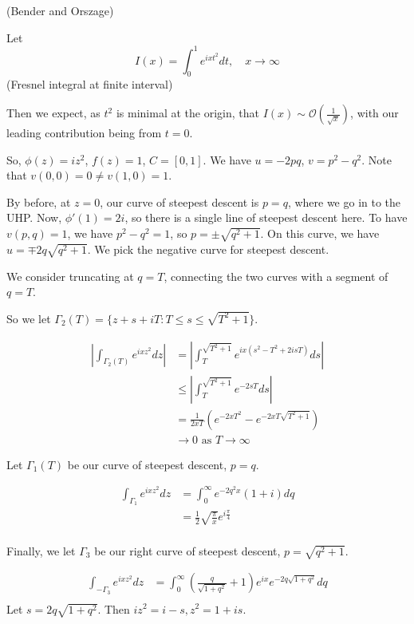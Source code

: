 \documentclass[a4paper]{article}
\begin{document}
\begin{eg} (Bender and Orszage)

Let \[
	I(x) = \int_0^{1} e^{ixt^2} dt, \quad x\to \infty
\] (Fresnel integral at finite interval)

Then we expect, as $t^2$ is minimal at the origin, that $I(x) \sim \mathcal{O}\left(\frac{1}{\sqrt{x} }\right)$, with our leading contribution being from $t=0$. 

So, $\phi(z) = iz^2$, $f(z) = 1$, $C = [0,1]$. We have  $u = -2pq$, $v = p^2 - q^2$. Note that $v(0,0)  = 0 \neq v(1,0) = 1$.

By before, at $z =0$, our curve of steepest descent is $p=q$, where we go in to the UHP. Now, $\phi'(1) = 2i$, so there is a single line of steepest descent here. To have $v(p,q) = 1$, we have $p^2 - q^2 = 1$, so $p = \pm \sqrt{q^2 + 1} $. On this curve, we have $u = \mp 2q\sqrt{q^2 + 1} $. We pick the negative curve for steepest descent.  

We consider truncating at $q=T$, connecting the two curves with a segment of $q=T$.  

So we let $\Gamma_2(T) = \{z + s + iT: T \le s \le \sqrt{T^2 +1} \} $.

\begin{align*}
	\left| \int_{\Gamma_2(T)} e^{ixz^2} dz \right| &= \left| \int_{T}^{\sqrt{T^2 + 1} } e^{ix \left( s^2 -T^2  + 2isT \right) } ds \right| \\
	&\le  \left| \int_T^{\sqrt{T^2 + 1} } e^{-2sT} ds  \right| \\
	&= \frac{1}{2xT} \left( e^{-2xT^2} - e^{-2xT\sqrt{T^2 + 1} } \right)  \\
	& \to 0 \text{ as } T \to \infty
\end{align*}

Let $\Gamma_1(T)$ be our curve of steepest descent,  $p=q$.

\begin{align*}
	\int_{\Gamma_1}  e^{ixz^2} dz &= \int_0^{\infty} e^{-2q^2 x} (1+i) dq  \\
	&= \frac{1}{2} \sqrt{\frac{\pi}{x}} e^{i\frac{\pi}{4}} \\
\end{align*}

Finally, we let $\Gamma_3$ be our right curve of steepest descent, $p = \sqrt{q^2 + 1} $.

\begin{align*}
	\int_{-\Gamma_3} e^{ixz^2} dz &= \int_{0}^{\infty} \left( \frac{q}{\sqrt{1+q^2} } + 1 \right) e^{ix}e^{-2q\sqrt{1+q^2} } dq\\
\end{align*}
Let $s = 2q \sqrt{1+q^2} $. Then $i z^2 = i - s, z^2 = 1 + is$.


\end{eg}
\end{document}
